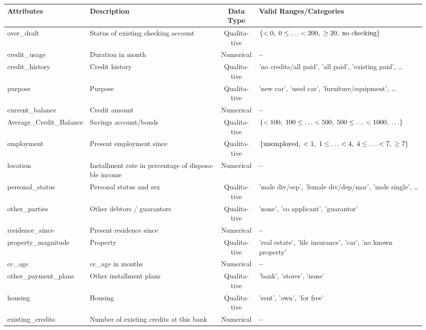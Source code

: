 \documentclass[journal]{IEEEtran}
\newcommand{\نیمفاصله}{\halfspace}
\renewcommand{\ }{\halfspace}
\newcommand{\وکا}{\lr{WEKA} }
\newcommand{\ار}{\lr{R} }
\renewcommand{\|}[1][.3em]{\hspace{#1}|\hspace{#1}}
\renewcommand{\,}[1][.3em]{,\hspace{#1}}
\begin{document}
\begin{table}[ht]
\centering
\begin{latin}
\begin{adjustwidth}{-.34in}{0in}
\begin{tabular}{l|l|c|l}
Attributes & Description & Data Type & Valid Ranges/Categories\\\hline
over\_draft & Status of existing checking account & Qualitative & $\{<0\, 0\leq\ldots<200\, \geq20\,\text{no checking}\}$\\
credit\_usage & Duration in month & Numerical & \textbf{--} \\
credit\_history & Credit history & Qualitative & \footnotesize{'no credits/all paid'\, 'all paid'\, 'existing paid'\, \ldots}\\
purpose & Purpose & Qualitative & \footnotesize{'new car'\, 'used car'\, 'furniture/equipment'\, \ldots}\\
current\_balance & Credit amount & Numerical & \textbf{--} \\
Average\_Credit\_Balance & Savings account/bonds & Qualitative & \scriptsize{$\{<100\, 100\leq\ldots<500\, 500\leq\ldots<1000\,\ldots\}$}\\
employment & Present employment since & Qualitative & \scriptsize{$\{\text{unemployed}\, <1\, 1\leq\ldots<4\, 4\leq\ldots<7\, \geq7\}$}\\
location & Installment rate in percentage of disposable income & Numerical & \textbf{--} \\
personal\_status & Personal status and sex & Qualitative & \footnotesize{'male div/sep'\, 'female div/dep/mar'\, 'male single'\, \dots}\\
other\_parties & Other debtors / guarantors &  Qualitative & \footnotesize{'none'\, 'co applicant'\, 'guarantor'}\\
residence\_since & Present residence since & Numerical & \textbf{--} \\
property\_magnitude & Property & Qualitative & \footnotesize{'real estate'\, 'life insurance'\, 'car'\, 'no known property'}\\
cc\_age & cc\_age in months & Numerical & \textbf{--} \\
other\_payment\_plans & Other installment plans & Qualitative & \footnotesize{'bank'\, 'stores'\, 'none'}\\
housing & Housing & Qualitative & \footnotesize{'rent'\, 'own'\, 'for free'}\\
existing\_credits & Number of existing credits at this bank & Numerical & \textbf{--} \\

\end{tabular}
\end{adjustwidth}
\end{latin}
\end{table}
\end{document}
